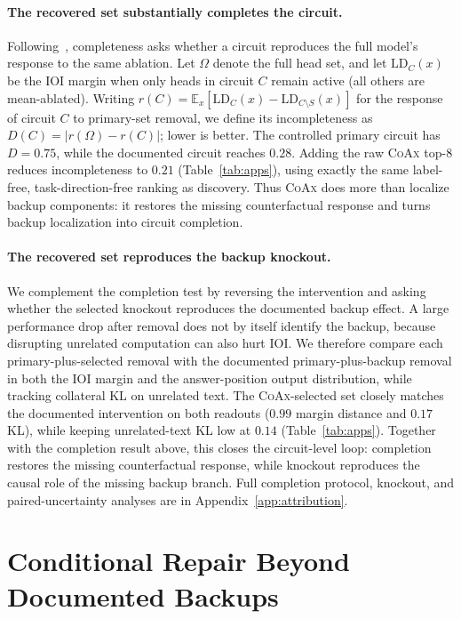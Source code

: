 \documentclass{article} %
\theoremstyle{plain}
\theoremstyle{definition}
\newcommand{\coax}{\textsc{CoAx}\xspace}
\begin{document}
\paragraph{The recovered set substantially completes the circuit.}
Following~\citet{wang2022ioi}, completeness asks whether a circuit reproduces
the full model's response to the same ablation.
Let $\Omega$ denote the full head set, and let $\mathrm{LD}_C(x)$ be the IOI
margin when only heads in circuit $C$ remain active (all others are mean-ablated).
Writing
$r(C)=\mathbb{E}_x[\mathrm{LD}_C(x)-\mathrm{LD}_{C\setminus S}(x)]$
for the response of circuit $C$ to primary-set removal, we define its
incompleteness as
$D(C)=|r(\Omega)-r(C)|$; lower is better.
The controlled primary circuit has $D=0.75$, while the documented circuit
reaches $0.28$.
Adding the raw \coax top-$8$ reduces incompleteness to $0.21$
(Table~\ref{tab:apps}), using exactly the same label-free,
task-direction-free ranking as discovery.
Thus \coax does more than localize backup components: it restores the missing
counterfactual response and turns backup localization into circuit completion.

\paragraph{The recovered set reproduces the backup knockout.}
We complement the completion test by reversing the intervention and asking whether the selected knockout reproduces the documented backup effect.
A large performance drop after removal does not by itself identify the backup, because disrupting unrelated computation can also hurt IOI.
We therefore compare each primary-plus-selected removal with the documented primary-plus-backup removal in both the IOI margin and the answer-position output distribution, while tracking collateral KL on unrelated text.
The \coax-selected set closely matches the documented intervention on both readouts ($0.99$ margin distance and $0.17$ KL), while keeping unrelated-text KL low at $0.14$ (Table~\ref{tab:apps}).
Together with the completion result above, this closes the circuit-level loop: completion restores the missing counterfactual response, while knockout reproduces the causal role of the missing backup branch. 
Full completion protocol, knockout, and paired-uncertainty analyses are in Appendix~\ref{app:attribution}.

\section{Conditional Repair Beyond Documented Backups}
\label{sec:panel}
\end{document}
